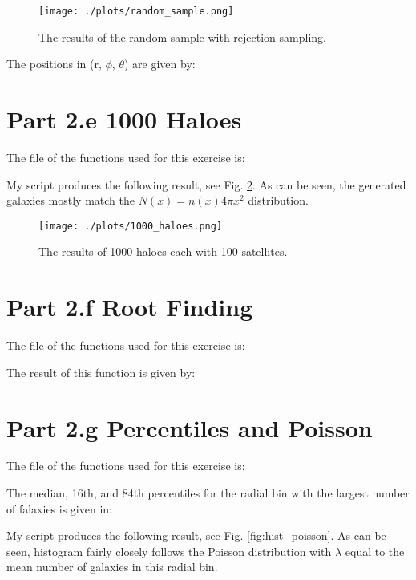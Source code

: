 \begin{figure}[h!]
  \centering
  \texttt{[image: ./plots/random\_sample.png]}
  \caption{The results of the random sample with rejection sampling.}
  \label{fig:rand_sample}
\end{figure}

The positions in (r, $\phi$, $\theta$) are given by:



\section{Part 2.e 1000 Haloes}

The file of the functions used for this exercise is:



My script produces the following result, see Fig. \ref{fig:1000_haloes}. As can be seen, the generated galaxies mostly match
the $N(x) = n(x)4\pi x^2$ distribution.

\begin{figure}[h!]
  \centering
  \texttt{[image: ./plots/1000\_haloes.png]}
  \caption{The results of 1000 haloes each with 100 satellites. }
  \label{fig:1000_haloes}
\end{figure}

\section{Part 2.f Root Finding}

The file of the functions used for this exercise is:



The result of this function is given by:



\section{Part 2.g Percentiles and Poisson}

The file of the functions used for this exercise is:



The median, 16th, and 84th percentiles for the radial bin with the largest number of falaxies is given in:



My script produces the following result, see Fig. \ref{fig:hist_poisson}. As can be seen, histogram fairly closely follows
the Poisson distribution with $\lambda$ equal to the mean number of galaxies in this radial bin.

